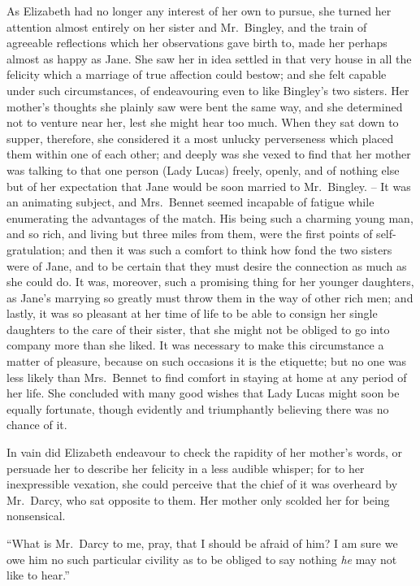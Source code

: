 As Elizabeth had no longer any interest of her own to
pursue, she turned her attention almost entirely on her
sister and Mr.\ Bingley, and the train of agreeable reflections
which her observations gave birth to, made her
perhaps almost as happy as Jane. She saw her in idea
settled in that very house in all the felicity which a marriage
of true affection could bestow; and she felt capable
under such circumstances, of endeavouring even to like
Bingley’s two sisters. Her mother’s thoughts she plainly
saw were bent the same way, and she determined not to
venture near her, lest she might hear too much. When they
sat down to supper, therefore, she considered it a most
unlucky perverseness which placed them within one of
each other; and deeply was she vexed to find that her
mother was talking to that one person (Lady Lucas)
freely, openly, and of nothing else but of her expectation
that Jane would be soon married to Mr.\ Bingley. -- It was
an animating subject, and Mrs.\ Bennet seemed incapable
of fatigue while enumerating the advantages of the match.
His being such a charming young man, and so rich, and
living but three miles from them, were the first points
of self-gratulation; and then it was such a comfort to
think how fond the two sisters were of Jane, and to be
certain that they must desire the connection as much as
she could do. It was, moreover, such a promising thing for
her younger daughters, as Jane’s marrying so greatly
must throw them in the way of other rich men; and
lastly, it was so pleasant at her time of life to be able to
consign her single daughters to the care of their sister,
that she might not be obliged to go into company more
than she liked. It was necessary to make this circumstance
a matter of pleasure, because on such occasions
it is the etiquette; but no one was less likely than
Mrs.\ Bennet to find comfort in staying at home at any period
of her life. She concluded with many good wishes that
Lady Lucas might soon be equally fortunate, though
evidently and triumphantly believing there was no chance
of it.

In vain did Elizabeth endeavour to check the rapidity
of her mother’s words, or persuade her to describe her
felicity in a less audible whisper; for to her inexpressible
vexation, she could perceive that the chief of it
was overheard by Mr.\ Darcy, who sat opposite to them.
Her mother only scolded her for being nonsensical.

“What is Mr.\ Darcy to me, pray, that I should be
afraid of him? I am sure we owe him no such particular
civility as to be obliged to say nothing \textit{he} may not like
to hear.”


